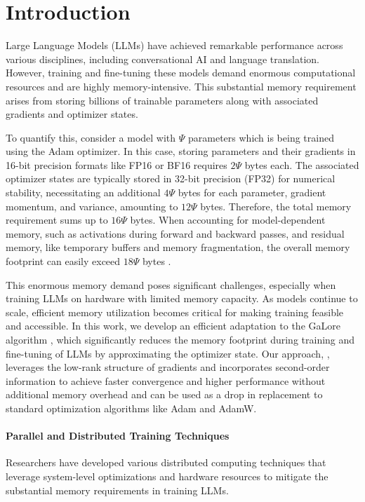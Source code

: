 
\vspace{-4mm}
\section{Introduction}
Large Language Models (LLMs) have achieved remarkable performance across various disciplines, including conversational AI and language translation. However, training and fine-tuning these models demand enormous computational resources and are highly memory-intensive. This substantial memory requirement arises from storing billions of trainable parameters along with associated gradients and optimizer states.

To quantify this, consider a model with $\Psi$ parameters which is being trained using the Adam optimizer. In this case, storing parameters and their gradients in 16-bit precision formats like FP16 or BF16 requires $2\Psi$ bytes each. The associated optimizer states are typically stored in 32-bit precision (FP32) for numerical stability, necessitating an additional $4\Psi$ bytes for each parameter, gradient momentum, and variance, amounting to $12\Psi$ bytes. Therefore, the total memory requirement sums up to $16\Psi$ bytes. When accounting for model-dependent memory, such as activations during forward and backward passes, and residual memory, like temporary buffers and memory fragmentation, the overall memory footprint can easily exceed $18\Psi$ bytes \citep{raffelExploringLimitsTransfer2020,touvronLlamaOpenFoundation2023,chowdheryPaLMScalingLanguage2022}.

This enormous memory demand poses significant challenges, especially when training LLMs on hardware with limited memory capacity. As models continue to scale, efficient memory utilization becomes critical for making training feasible and accessible. In this work, we develop an efficient adaptation to the GaLore algorithm \citep{zhao2024galore}, which significantly reduces the memory footprint during training and fine-tuning of LLMs by approximating the optimizer state. Our approach, \textit{\lowrank}, leverages the low-rank structure of gradients and incorporates second-order information to achieve faster convergence and higher performance without additional memory overhead and can be used as a drop in replacement to standard optimization algorithms like Adam and AdamW.

\paragraph{Parallel and Distributed Training Techniques}
Researchers have developed various distributed computing techniques that leverage system-level optimizations and hardware resources to mitigate the substantial memory requirements in training LLMs.

